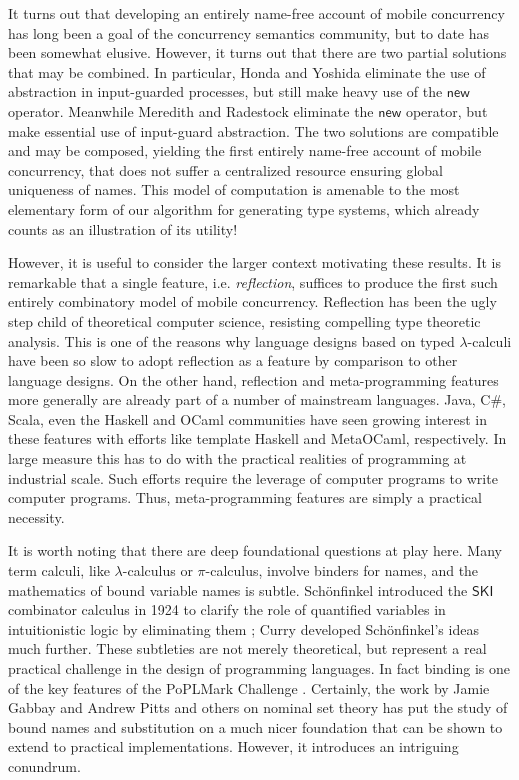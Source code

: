 \documentclass[submission,copyright,creativecommons]{eptcs}
\newcommand{\pic}{$\pi$-calculus}
\theoremstyle{definition}
\theoremstyle{remark}
\theoremstyle{remark}
\begin{document}
It turns out that developing an entirely name-free account of mobile
concurrency has long been a goal of the concurrency semantics
community, but to date has been somewhat elusive. However, it turns
out that there are two partial solutions that may be combined. In
particular, Honda and Yoshida eliminate the use of abstraction in
input-guarded processes, but still make heavy use of the
$\mathsf{new}$ operator. Meanwhile Meredith and Radestock
\cite{DBLP:journals/entcs/MeredithR05} eliminate the $\mathsf{new}$
operator, but make essential use of input-guard abstraction. The two
solutions are compatible and may be composed, yielding the first
entirely name-free account of mobile concurrency, that does not suffer
a centralized resource ensuring global uniqueness of names. This model
of computation is amenable to the most elementary form of our
algorithm for generating type systems, which already counts as an
illustration of its utility!

However, it is useful to consider the larger context motivating these
results. It is remarkable that a single feature,
i.e. \emph{reflection}, suffices to produce the first such entirely
combinatory model of mobile concurrency. Reflection has been the ugly
step child of theoretical computer science, resisting compelling type
theoretic analysis. This is one of the reasons why language designs
based on typed $\lambda$-calculi have been so slow to adopt reflection
as a feature by comparison to other language designs. On the other
hand, reflection and meta-programming features more generally are
already part of a number of mainstream languages. Java, C\#, Scala,
even the Haskell and OCaml communities have seen growing interest in
these features with efforts like template Haskell and MetaOCaml,
respectively. In large measure this has to do with the practical
realities of programming at industrial scale. Such efforts require the
leverage of computer programs to write computer programs. Thus,
meta-programming features are simply a practical necessity.

It is worth noting that there are deep foundational questions at play
here. Many term calculi, like $\lambda$-calculus or {\pic}, involve
binders for names, and the mathematics of bound variable names is
subtle. Sch\"onfinkel introduced the $\mathsf{SKI}$ combinator
calculus in 1924 to clarify the role of quantified variables in
intuitionistic logic by eliminating them \cite{finkel}; Curry
developed Sch\"onfinkel's ideas much further. These subtleties are not
merely theoretical, but represent a real practical challenge in the
design of programming languages. In fact binding is one of the key
features of the PoPLMark Challenge \cite{PoPLMark}. Certainly, the work by Jamie Gabbay and
Andrew Pitts \cite{DBLP:journals/fac/GabbayP02} and others
\cite{DBLP:journals/jcss/Clouston14} on nominal set theory has put the
study of bound names and substitution on a much nicer foundation that
can be shown to extend to practical implementations. However, it
introduces an intriguing conundrum.
\end{document}

